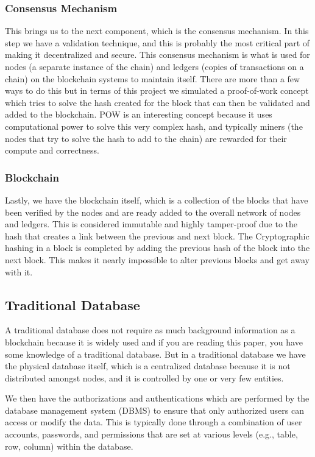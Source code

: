 \documentclass[conference]{IEEEtran} %
\begin{document}
\subsubsection{Consensus Mechanism} %
This brings us to the next component, which is the consensus mechanism. In this step we have a validation technique, and this is probably the most critical part of making it decentralized and secure. This consensus mechanism is what is used for nodes (a separate instance of the chain) and ledgers (copies of transactions on a chain) on the blockchain systems to maintain itself. There are more than a few ways to do this but in terms of this project we simulated a proof-of-work concept which tries to solve the hash created for the block that can then be validated and added to the blockchain. POW is an interesting concept because it uses computational power to solve this very complex hash, and typically miners (the nodes that try to solve the hash to add to the chain) are rewarded for their compute and correctness.

\subsubsection{Blockchain} %
Lastly, we have the blockchain itself, which is a collection of the blocks that have been verified by the nodes and are ready added to the overall network of nodes and ledgers. This is considered immutable and highly tamper-proof due to the hash that creates a link between the previous and next block. The Cryptographic hashing in a block is completed by adding the previous hash of the block into the next block. This makes it nearly impossible to alter previous blocks and get away with it.

\subsection{Traditional Database} %
A traditional database does not require as much background information as a blockchain because it is widely used and if you are reading this paper, you have some knowledge of a traditional database.
But in a traditional database we have the physical database itself, which is a centralized database because it is not distributed amongst nodes, and it is controlled by one or very few entities.


We then have the authorizations and authentications which are performed by the database management system (DBMS) to ensure that only authorized users can access or modify the data. This is typically done through a combination of user accounts, passwords, and permissions that are set at various levels (e.g., table, row, column) within the database.
\end{document}
